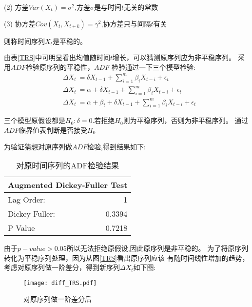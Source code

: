 \documentclass[12pt,a4paper]{nmmcm}
\begin{document}
  (2) 方差\(Var(X_t) = \sigma^2\),方差\(\sigma\)是与时间\(t\)无关的常数

  (3) 协方差\(Cov(X_t,X_{t+k}) = \gamma^2\),协方差只与间隔\(t\)有关  

  则称时间序列\(X_t\)是平稳的。

由表\ref{TRS}中可明显看出均值随时间\(t\)增长，可以猜测原序列应为非平稳序列。
采用\(ADF\)检验原序列的平稳性，\(ADF\) 检验通过一下三个模型检验:
\begin{equation}
  \begin{aligned}
  &\Delta X_t\ = \delta X_{t-1} + \sum_{i=1}^{m}\beta_i X_{t-i} + \epsilon_t \\
  &\Delta X_t\ =\alpha + \delta X_{t-1} + \sum_{i=1}^{m}\beta_i X_{t-i} + \epsilon_t \\
  &\Delta X_t\ =\alpha +\beta_t+ \delta X_{t-1} + \sum_{i=1}^{m}\beta_i X_{t-i} + \epsilon_t
  \end{aligned}
\end{equation}

三个模型原假设都是\(H_0 : \delta = 0\).若拒绝\(H_0\)则为平稳序列，否则为非平稳序列。
通过\(ADF \)临界值表判断是否接受\(H_0\)\nocite{Ruey}

为验证猜想对原序列做\(ADF\)检验,得到结果如下:
\begin{table}[htb]
  \centering
  \caption{对原时间序列的ADF检验结果}
    \begin{tabular}{lr}
    \multicolumn{2}{c}{ Augmented Dickey-Fuller Test} \\
    \hline
    Lag Order: & 1 \\
    Dickey-Fuller: & 0.3394\\
    P Value  & 0.7218 \\
    \end{tabular}%
  \label{tab:ADF_raw}%
\end{table}%

由于\(p-value > 0.05 \)所以无法拒绝原假设,因此原序列是非平稳的。
为了将原序列转化为平稳序列处理，因为从图\ref{TRS}看出原序列应该
有随时间线性增加的趋势，考虑对原序列做一阶差分\cite{Rob}，得到新序列\(\Delta X_t\)如下图:
\begin{figure}[H] %
  \centering %
  \texttt{[image: diff\_TRS.pdf]} %
  \caption{对原序列做一阶差分后} %
  \label{diff_TRS} %
\end{figure} 
\end{document}
